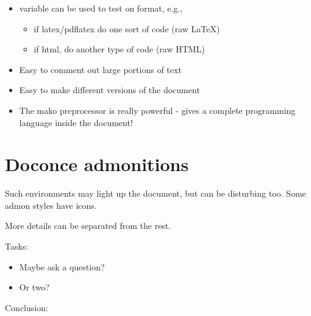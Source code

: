 \documentclass[%
twoside,                 %
draft,                   %
final,                   %
chapterprefix=true,      %
open=right               %
10pt]{book}
\newenvironment{graybox1admon}[1][]{
\begin{graybox1mdframed}[frametitle=#1]
}
{
\end{graybox1mdframed}
}
\begin{document}
\begin{shadedquoteBlue}
\begin{itemize}
 \item {} variable can be used to test on format, e.g.,
\begin{itemize}

    \item if latex/pdflatex do one sort of code (raw {\LaTeX})

    \item if html, do another type of code (raw HTML)

\end{itemize}

\noindent
 \item Easy to comment out large portions of text

 \item Easy to make different versions of the document

 \item The mako preprocessor is really powerful - gives a
   complete programming language inside the document!
\end{itemize}

\noindent
\section*{Doconce admonitions}


\begin{graybox1admon}[Use with caution!]
Such environments may light up the document, but can be disturbing too.
Some admon styles have icons.
\end{graybox1admon}




\begin{graybox1admon}[Going deeper.]
More details can be separated from the rest.
\end{graybox1admon}




\begin{graybox1admon}[Time for review!]
Tasks:

\begin{itemize}
  \item Maybe ask a question?

  \item Or two?
\end{itemize}

\noindent
\end{graybox1admon}




\begin{graybox1admon}[]
Conclusion:


\end{graybox1admon}
\end{shadedquoteBlue}
\end{document}
